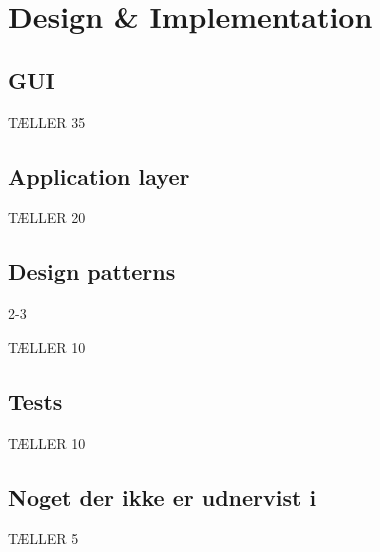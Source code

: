\chapter{Design \& Implementation}
\label{sec:design_and_implementation}

\section{GUI}
\label{sec:backend}

TÆLLER 35

\section{Application layer}
\label{sec:frontend}

TÆLLER 20


\section{Design patterns}
\label{sec:speed_optimization}

2-3

TÆLLER 10


\section{Tests}
\label{sec:cross-platform}

TÆLLER 10

\section{Noget der ikke er udnervist i}
\label{sec:cross-platform}

TÆLLER 5